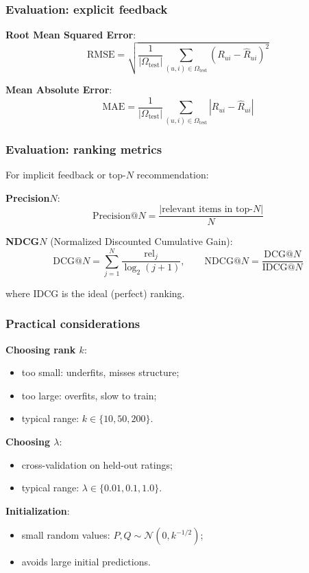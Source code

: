 \documentclass[]{beamer}
\begin{document}
\begin{frame}[fragile]
\frametitle{Evaluation: explicit feedback}
\textbf{Root Mean Squared Error}:
\begin{equation*}
\mathrm{RMSE} = \sqrt{\frac{1}{|\Omega_{\mathrm{test}}|}
  \sum_{(u,i)\in\Omega_{\mathrm{test}}} \left(R_{ui} - \hat{R}_{ui}\right)^2}
\end{equation*}

\textbf{Mean Absolute Error}:
\begin{equation*}
\mathrm{MAE} = \frac{1}{|\Omega_{\mathrm{test}}|}
  \sum_{(u,i)\in\Omega_{\mathrm{test}}} |R_{ui} - \hat{R}_{ui}|
\end{equation*}

\end{frame}

\begin{frame}[fragile]
\frametitle{Evaluation: ranking metrics}
For implicit feedback or top-$N$ recommendation:

\textbf{Precision\@$N$}:
\begin{equation*}
\mathrm{Precision@}N = \frac{|\text{relevant items in top-}N|}{N}
\end{equation*}

\textbf{NDCG\@$N$} (Normalized Discounted Cumulative Gain):
\begin{equation*}
\mathrm{DCG@}N = \sum_{j=1}^{N} \frac{\mathrm{rel}_j}{\log_2(j+1)}, \qquad
\mathrm{NDCG@}N = \frac{\mathrm{DCG@}N}{\mathrm{IDCG@}N}
\end{equation*}

where $\mathrm{IDCG}$ is the ideal (perfect) ranking.

\end{frame}

\begin{frame}[fragile]
\frametitle{Practical considerations}
\textbf{Choosing rank $k$}:
\begin{itemize}
  \item too small: underfits, misses structure;
  \item too large: overfits, slow to train;
  \item typical range: $k \in \{10, 50, 200\}$.
\end{itemize}

\textbf{Choosing $\lambda$}:
\begin{itemize}
  \item cross-validation on held-out ratings;
  \item typical range: $\lambda \in \{0.01, 0.1, 1.0\}$.
\end{itemize}

\textbf{Initialization}:
\begin{itemize}
  \item small random values: $P, Q \sim \mathcal{N}(0, k^{-1/2})$;
  \item avoids large initial predictions.
\end{itemize}

\end{frame}
\end{document}
